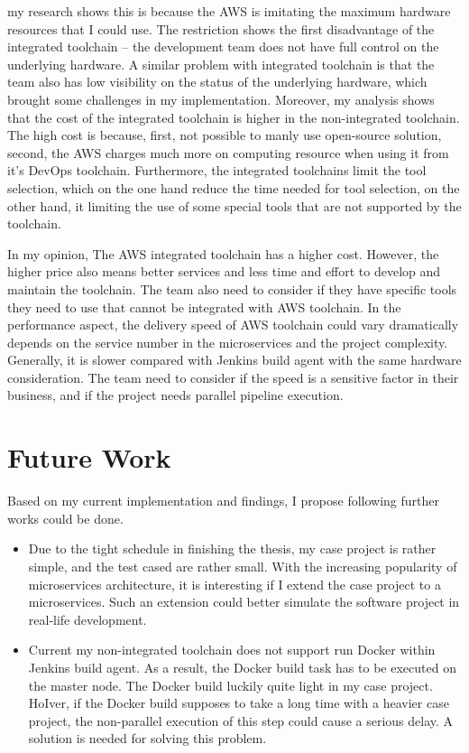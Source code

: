 my research shows this is because the AWS is imitating the maximum hardware resources that I could use. The restriction shows the first disadvantage of the integrated toolchain -- the development team does not have full control on the underlying hardware. A similar problem with integrated toolchain is that the team also has low visibility on the status of the underlying hardware, which brought some challenges in my implementation. Moreover, my analysis shows that the cost of the integrated toolchain is higher in the non-integrated toolchain. The high cost is because, first, not possible to manly use open-source solution, second, the AWS charges much more on computing resource when using it from it's DevOps toolchain.
Furthermore, the integrated toolchains limit the tool selection, which on the one hand reduce the time needed for tool selection, on the other hand, it limiting the use of some special tools that are not supported by the toolchain.
\par
In my opinion, The AWS integrated toolchain has a higher cost. However, the higher price also means better services and less time and effort to develop and maintain the toolchain. The team also need to consider if they have specific tools they need to use that cannot be integrated with AWS toolchain. In the performance aspect, the delivery speed of AWS toolchain could vary dramatically depends on the service number in the microservices and the project complexity. Generally, it is slower compared with Jenkins build agent with the same hardware consideration. The team need to consider if the speed is a sensitive factor in their business, and if the project needs parallel pipeline execution.
\section{Future Work}
Based on my current implementation and findings, I propose following further works could be done.
\begin{itemize}
    \item Due to the tight schedule in finishing the thesis, my case project is rather simple, and the test cased are rather small.  With the increasing popularity of microservices architecture, it is interesting if I extend the case project to a microservices. Such an extension could better simulate the software project in real-life development.
    \item Current my non-integrated toolchain does not support run Docker within Jenkins build agent. As a result, the Docker build task has to be executed on the master node. The Docker build luckily quite light in my case project. HoIver, if the Docker build supposes to take a long time with a heavier case project, the non-parallel execution of this step could cause a serious delay. A solution is needed for solving this problem.
\end{itemize}


